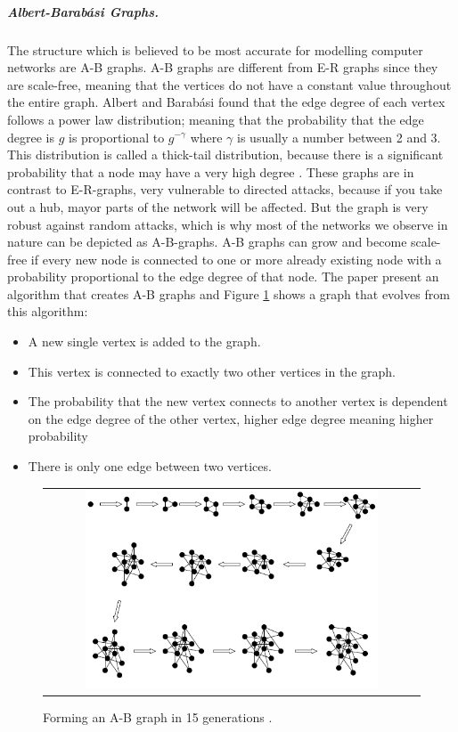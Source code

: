 \subparagraph{\label{ABgraph}Albert-Barabási Graphs.}
The structure which is believed to be most accurate for modelling computer networks are A-B graphs. A-B graphs are different from E-R graphs since they are scale-free, meaning that the vertices do not have a constant value throughout the entire graph. Albert and Barabási found that the edge degree of each vertex follows a power law distribution; meaning that the probability that the edge degree is $g$ is proportional to $g^{-\gamma}$
where $\gamma$ is usually a number between 2 and 3. This distribution is called a thick-tail distribution, because there is a significant probability that a node may have a very high degree \cite{audestad}.
These graphs are in contrast to E-R-graphs, very vulnerable to directed attacks, because if you take out a hub, mayor parts of the network will be affected. But the graph is very robust against random attacks, which is why most of the networks we observe in nature can be depicted as A-B-graphs.
A-B graphs can grow and become scale-free if every new node is connected to one or more already existing node with a probability proportional to the edge degree of that node. The paper present an algorithm that creates A-B graphs and Figure \ref{fig:ABgraphcreation} shows a graph that evolves from this algorithm:

\begin{itemize}
\item A new single vertex is added to the graph.
\item This vertex is connected to exactly two other vertices in the graph.
\item The probability that the new vertex connects to another vertex is dependent on the edge degree of the other vertex, higher edge degree meaning higher probability
\item There is only one edge between two vertices.
\end{itemize}


\begin{figure}[h]
\centering
\begin{tabular}{@{}c@{}}
\includegraphics[width=0.8\textwidth]{../Figures/ABgraphcreation.png}
\end{tabular}
\caption{\label{fig:ABgraphcreation} Forming an A-B graph in 15 generations \cite{audestad}.}
\end{figure}

